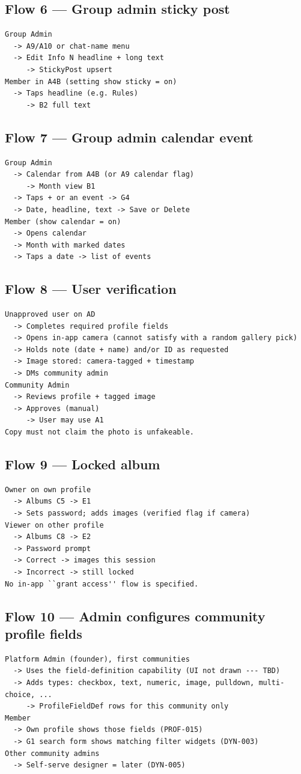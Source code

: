 \documentclass[11pt,a4paper]{article}
\begin{document}
\subsection{Flow 6 --- Group admin sticky post}
\begin{verbatim}
Group Admin
  -> A9/A10 or chat-name menu
  -> Edit Info N headline + long text
     -> StickyPost upsert
Member in A4B (setting show sticky = on)
  -> Taps headline (e.g. Rules)
     -> B2 full text
\end{verbatim}

\subsection{Flow 7 --- Group admin calendar event}
\begin{verbatim}
Group Admin
  -> Calendar from A4B (or A9 calendar flag)
     -> Month view B1
  -> Taps + or an event -> G4
  -> Date, headline, text -> Save or Delete
Member (show calendar = on)
  -> Opens calendar
  -> Month with marked dates
  -> Taps a date -> list of events
\end{verbatim}

\subsection{Flow 8 --- User verification}
\begin{verbatim}
Unapproved user on AD
  -> Completes required profile fields
  -> Opens in-app camera (cannot satisfy with a random gallery pick)
  -> Holds note (date + name) and/or ID as requested
  -> Image stored: camera-tagged + timestamp
  -> DMs community admin
Community Admin
  -> Reviews profile + tagged image
  -> Approves (manual)
     -> User may use A1
Copy must not claim the photo is unfakeable.
\end{verbatim}

\subsection{Flow 9 --- Locked album}
\begin{verbatim}
Owner on own profile
  -> Albums C5 -> E1
  -> Sets password; adds images (verified flag if camera)
Viewer on other profile
  -> Albums C8 -> E2
  -> Password prompt
  -> Correct -> images this session
  -> Incorrect -> still locked
No in-app ``grant access'' flow is specified.
\end{verbatim}

\subsection{Flow 10 --- Admin configures community profile fields}
\begin{verbatim}
Platform Admin (founder), first communities
  -> Uses the field-definition capability (UI not drawn --- TBD)
  -> Adds types: checkbox, text, numeric, image, pulldown, multi-choice, ...
     -> ProfileFieldDef rows for this community only
Member
  -> Own profile shows those fields (PROF-015)
  -> G1 search form shows matching filter widgets (DYN-003)
Other community admins
  -> Self-serve designer = later (DYN-005)
\end{verbatim}
\end{document}

